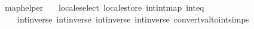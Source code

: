 \begin{isabellebody}
\isamarkupfalse%
\ map{\isacharunderscore}{\kern0pt}helper\ {\isacharequal}{\kern0pt}\isanewline
\ \ locale{\isacharunderscore}{\kern0pt}select\ locale{\isacharunderscore}{\kern0pt}store\ intintmap\ inteq\ \isanewline
\ \ \ \ int{\isacharunderscore}{\kern0pt}inverse{\isacharunderscore}{\kern0pt}{}\ int{\isacharunderscore}{\kern0pt}inverse{\isacharunderscore}{\kern0pt}{}\ int{\isacharunderscore}{\kern0pt}inverse{\isacharunderscore}{\kern0pt}{}\ int{\isacharunderscore}{\kern0pt}inverse{\isacharunderscore}{\kern0pt}{}\ convert{\isacharunderscore}{\kern0pt}val{\isacharunderscore}{\kern0pt}to{\isacharunderscore}{\kern0pt}int{\isachardot}{\kern0pt}simps\isanewline
%
\isadelimtheory
\isanewline
%
\endisadelimtheory
%
\isatagtheory
{}\isamarkupfalse%
%
\endisatagtheory
{\isafoldtheory}%
%
\isadelimtheory
%
\endisadelimtheory
%
\end{isabellebody}%
\endinput
